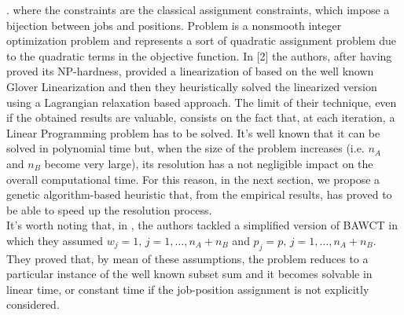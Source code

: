 \documentclass[opre,nonblindrev]{informs3} %
\begin{document}
\ea
\right.
\ee
where the constraints are the classical assignment constraints, which impose a bijection between jobs and positions. 
Problem  is a nonsmooth integer optimization problem and represents a sort of quadratic assignment problem due to the quadratic terms in the objective function. In [2] the authors, after having proved its NP-hardness, provided a linearization of  based on the well known Glover Linearization and then they heuristically solved the linearized version using a Lagrangian relaxation based approach. The limit of their technique, even if the obtained results are valuable, consists on the fact that, at each iteration, a Linear Programming problem has to be solved. It's well known that it can be solved in polynomial time but, when the size of the problem increases (i.e. $n_A$ and $n_B$ become very large), its resolution has a not negligible impact on the overall computational time. For this reason, in the next section, we propose a genetic algorithm-based heuristic that, from the empirical results, has proved to be able to speed up the resolution process.\\
It's worth noting that, in \cite{av-fud20}, the authors tackled a simplified version of BAWCT in which they assumed $w_j=1, \, j=1,\ldots,n_A+n_B$ and $p_j=p, \, j=1,\ldots,n_A+n_B$. They proved that, by mean of these assumptions, the problem reduces to a particular instance of the well known subset sum and it becomes solvable in linear time, or constant time if the job-position assignment is not explicitly considered.
\end{document}
